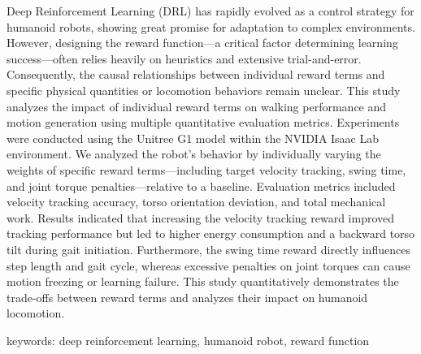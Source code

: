 \vspace{1.0zh}
%
Deep Reinforcement Learning (DRL) has rapidly evolved as a control strategy for humanoid robots, showing great promise for adaptation to complex environments. However, designing the reward function—a critical factor determining learning success—often relies heavily on heuristics and extensive trial-and-error. Consequently, the causal relationships between individual reward terms and specific physical quantities or locomotion behaviors remain unclear.
This study analyzes the impact of individual reward terms on walking performance and motion generation using multiple quantitative evaluation metrics. Experiments were conducted using the Unitree G1 model within the NVIDIA Isaac Lab environment. We analyzed the robot's behavior by individually varying the weights of specific reward terms—including target velocity tracking, swing time, and joint torque penalties—relative to a baseline. Evaluation metrics included velocity tracking accuracy, torso orientation deviation, and total mechanical work.
Results indicated that increasing the velocity tracking reward improved tracking performance but led to higher energy consumption and a backward torso tilt during gait initiation. Furthermore, the swing time reward directly influences step length and gait cycle, whereas excessive penalties on joint torques can cause motion freezing or learning failure. This study quantitatively demonstrates the trade-offs between reward terms and analyzes their impact on humanoid locomotion.

keywords: deep reinforcement learning, humanoid robot, reward function
